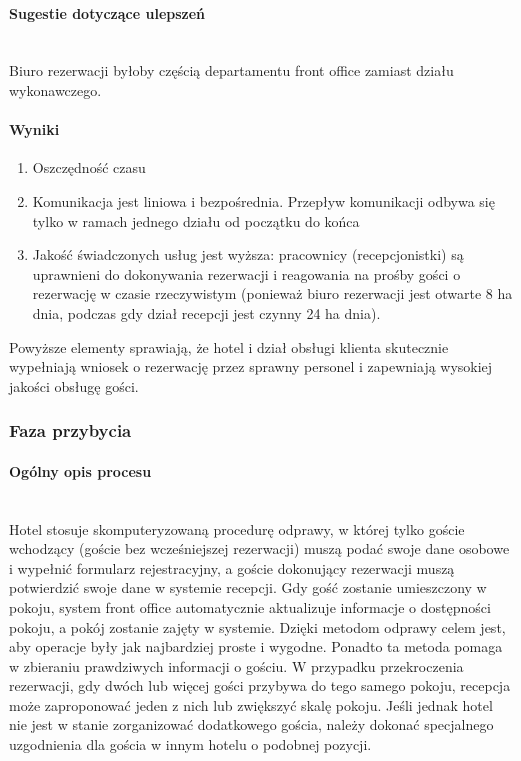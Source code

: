 \documentclass[a4paper, 12pt]{article}
\begin{document}
\paragraph{Sugestie dotyczące ulepszeń}\mbox{}\\
Biuro rezerwacji byłoby częścią departamentu front office zamiast działu wykonawczego.
\paragraph{Wyniki}
\begin{enumerate}
	\item Oszczędność czasu
	\item Komunikacja jest liniowa i bezpośrednia. Przepływ komunikacji odbywa się tylko w ramach jednego działu od początku do końca
	\item Jakość świadczonych usług jest wyższa: pracownicy (recepcjonistki) są uprawnieni do dokonywania rezerwacji i reagowania na prośby gości o rezerwację w czasie rzeczywistym (ponieważ biuro rezerwacji jest otwarte 8 ha dnia, podczas gdy dział recepcji jest czynny 24 ha dnia).
\end{enumerate}
\hspace{1cm} Powyższe elementy sprawiają, że hotel i dział obsługi klienta skutecznie wypełniają wniosek o rezerwację przez sprawny personel i zapewniają wysokiej jakości obsługę gości.
\subsubsection{Faza przybycia}
\paragraph{Ogólny opis procesu}\mbox{}\\
Hotel stosuje skomputeryzowaną procedurę odprawy, w której tylko goście wchodzący (goście bez wcześniejszej rezerwacji) muszą podać swoje dane osobowe i wypełnić formularz rejestracyjny, a goście dokonujący rezerwacji muszą potwierdzić swoje dane w systemie recepcji.\newline
\hspace*{1cm}Gdy gość zostanie umieszczony w pokoju, system front office automatycznie aktualizuje informacje o dostępności pokoju, a pokój zostanie zajęty w systemie. Dzięki metodom odprawy celem jest, aby operacje były jak najbardziej proste i wygodne. Ponadto ta metoda pomaga w zbieraniu prawdziwych informacji o gościu.\newline
\hspace*{1cm}W przypadku przekroczenia rezerwacji, gdy dwóch lub więcej gości przybywa do tego samego pokoju, recepcja może zaproponować jeden z nich lub zwiększyć skalę pokoju. Jeśli jednak hotel nie jest w stanie zorganizować dodatkowego gościa, należy dokonać specjalnego uzgodnienia dla gościa w innym hotelu o podobnej pozycji.
\end{document}
